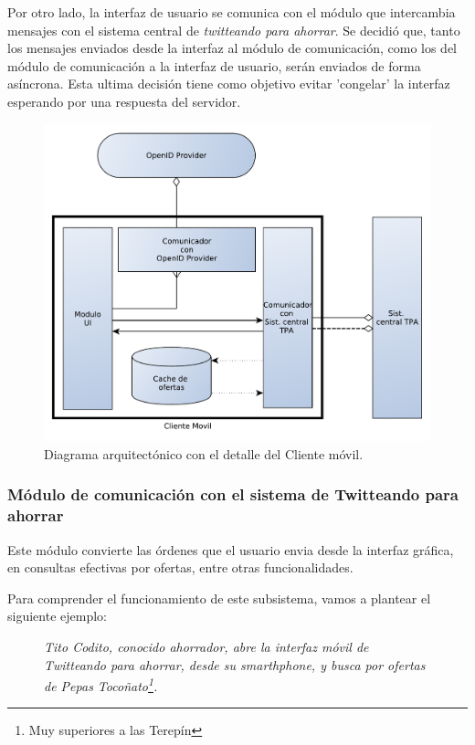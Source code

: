 Por otro lado, la interfaz de usuario se comunica con el módulo que intercambia mensajes con el sistema central de \emph{twitteando para ahorrar}. Se decidió que, tanto los mensajes enviados desde la interfaz al módulo de comunicación, como los del módulo de comunicación a la interfaz de usuario, serán enviados de forma asíncrona. Esta ultima decisión tiene como objetivo evitar 'congelar' la interfaz esperando por una respuesta del servidor.

\begin{figure}[H]
	\centering
	\includegraphics[width=\textwidth]{graficos/arch/Cliente_movil.pdf}
	\caption{Diagrama arquitectónico con el detalle del \textsf{Cliente móvil}.}
\end{figure}

\subsubsection{Módulo de comunicación con el sistema de Twitteando para ahorrar}

Este módulo convierte las órdenes que el usuario envia desde la interfaz gráfica, en consultas efectivas por ofertas, entre otras funcionalidades.

Para comprender el funcionamiento de este subsistema, vamos a plantear el siguiente ejemplo:

\begin{figure}[H]
	\centering
	\emph{Tito Codito, conocido ahorrador, abre la interfaz móvil de Twitteando para ahorrar, desde su smarthphone, y busca por ofertas de \emph{Pepas Tocoñato}\footnote{Muy superiores a las Terepín}.}
\end{figure}

